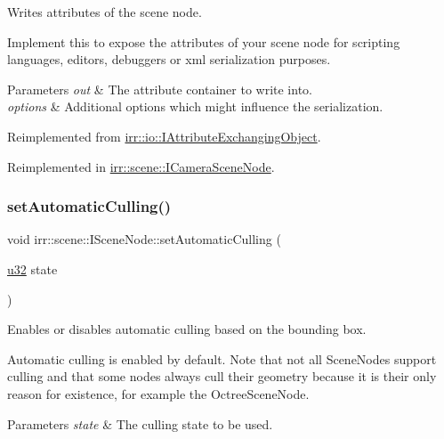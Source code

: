 Writes attributes of the scene node. 

Implement this to expose the attributes of your scene node for scripting languages, editors, debuggers or xml serialization purposes. 
\begin{DoxyParams}{Parameters}
{\em out} & The attribute container to write into. \\
\hline
{\em options} & Additional options which might influence the serialization. \\
\hline
\end{DoxyParams}


Reimplemented from \hyperlink{classirr_1_1io_1_1IAttributeExchangingObject_a587f7b633366968f0488e1099e9172ef}{irr\+::io\+::\+I\+Attribute\+Exchanging\+Object}.



Reimplemented in \hyperlink{classirr_1_1scene_1_1ICameraSceneNode_a0a78a29638be1665ee5dba22c2c3b846}{irr\+::scene\+::\+I\+Camera\+Scene\+Node}.

\mbox{\label{classirr_1_1scene_1_1ISceneNode_a5fcd62dbf524b8d2d6daa61c7d6cf119}} 
\subsubsection{\texorpdfstring{set\+Automatic\+Culling()}{setAutomaticCulling()}}
{\footnotesize\ttfamily void irr\+::scene\+::\+I\+Scene\+Node\+::set\+Automatic\+Culling (\begin{DoxyParamCaption}\item[{\hyperlink{namespaceirr_a0416a53257075833e7002efd0a18e804}{u32}}]{state }\end{DoxyParamCaption})\hspace{0.3cm}{\ttfamily [inline]}}



Enables or disables automatic culling based on the bounding box. 

Automatic culling is enabled by default. Note that not all Scene\+Nodes support culling and that some nodes always cull their geometry because it is their only reason for existence, for example the Octree\+Scene\+Node. 
\begin{DoxyParams}{Parameters}
{\em state} & The culling state to be used. \\
\hline
\end{DoxyParams}
\mbox{\label{classirr_1_1scene_1_1ISceneNode_ad83877ca84fa9cde95f099f961e80577}} 
